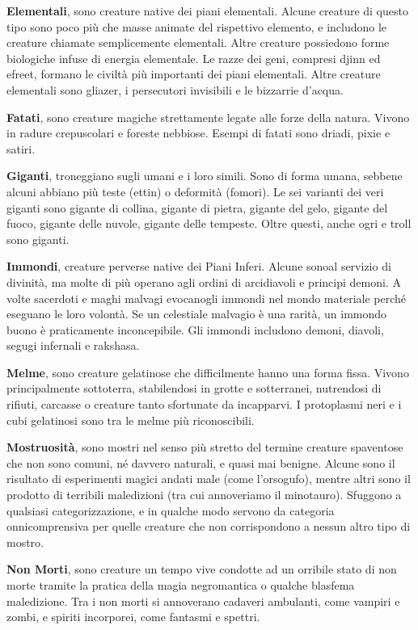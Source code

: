 \medskip\textbf{Elementali}, sono creature native dei piani elementali. Alcune creature di questo tipo sono poco più che masse animate del rispettivo elemento, e includono le creature chiamate semplicemente elementali. Altre creature possiedono forme biologiche infuse di energia elementale. Le razze dei geni, compresi djinn ed efreet, formano le civiltà più importanti dei piani elementali. Altre creature elementali sono gliazer, i persecutori  invisibili e le bizzarrie d'acqua. 

\medskip\textbf{Fatati}, sono creature magiche strettamente legate alle forze della natura. Vivono in radure crepuscolari e foreste nebbiose. Esempi di fatati sono driadi, pixie e satiri.

\medskip\textbf{Giganti}, troneggiano sugli umani e i loro simili. Sono di forma umana, sebbene alcuni abbiano più teste (ettin) o deformità (fomori). Le sei varianti dei veri giganti sono gigante di collina, gigante di pietra, gigante del gelo, gigante del fuoco, gigante delle nuvole, gigante delle tempeste. Oltre questi, anche ogri e troll sono giganti. 

\medskip\textbf{Immondi}, creature perverse native dei Piani Inferi. Alcune sonoal servizio di  divinità, ma molte di più operano agli ordini di arcidiavoli e principi demoni. A volte sacerdoti e maghi malvagi evocanogli immondi nel mondo materiale perché eseguano le loro volontà. Se un celestiale malvagio è una rarità, un immondo buono è praticamente inconcepibile. Gli immondi includono demoni, diavoli, segugi infernali e rakshasa. 

\medskip\textbf{Melme}, sono creature gelatinose che difficilmente hanno una forma fissa. Vivono principalmente sottoterra, stabilendosi in grotte e sotterranei, nutrendosi di rifiuti, carcasse o creature tanto sfortunate da incapparvi. I protoplasmi neri e i cubi gelatinosi sono tra le melme più riconoscibili.

\medskip\textbf{Mostruosità}, sono mostri nel senso più stretto del termine creature spaventose che non sono comuni, né davvero naturali, e quasi mai benigne. Alcune sono il risultato di esperimenti magici andati male (come l'orsogufo), mentre altri sono il prodotto di terribili maledizioni (tra cui annoveriamo il minotauro). Sfuggono a qualsiasi categorizzazione, e in qualche modo servono da categoria onnicomprensiva per quelle creature che non corrispondono a nessun altro tipo di mostro. 

\medskip\textbf{Non Morti}, sono creature un tempo vive condotte ad un orribile stato di non morte tramite la pratica della magia negromantica o qualche blasfema maledizione. Tra i non morti si annoverano cadaveri ambulanti, come vampiri e zombi, e spiriti incorporei, come fantasmi e spettri.

